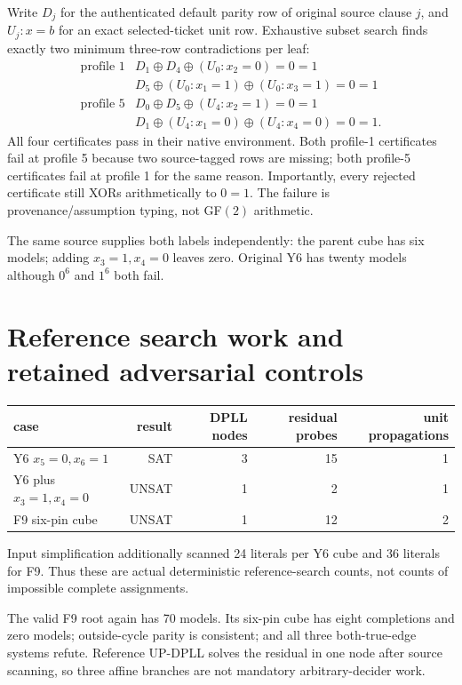 \documentclass[11pt]{article}
\begin{document}
Write $D_j$ for the authenticated default parity row of original source clause $j$, and $U_{j}:x=b$ for an exact selected-ticket unit row.  Exhaustive subset search finds exactly two minimum three-row contradictions per leaf:
\[
\begin{array}{c|l}
\text{profile 1}&D_1\oplus D_4\oplus(U_0:x_2=0)=0=1\\
&D_5\oplus(U_0:x_1=1)\oplus(U_0:x_3=1)=0=1\\[2pt]
\text{profile 5}&D_0\oplus D_5\oplus(U_4:x_2=1)=0=1\\
&D_1\oplus(U_4:x_1=0)\oplus(U_4:x_4=0)=0=1.
\end{array}
\]
All four certificates pass in their native environment.  Both profile-1 certificates fail at profile 5 because two source-tagged rows are missing; both profile-5 certificates fail at profile 1 for the same reason.  Importantly, every rejected certificate still XORs arithmetically to $0=1$.  The failure is provenance/assumption typing, not GF$(2)$ arithmetic.

The same source supplies both labels independently: the parent cube has six models; adding $x_3=1,x_4=0$ leaves zero.  Original Y6 has twenty models although $0^6$ and $1^6$ both fail.

\section{Reference search work and retained adversarial controls}
\begin{center}
\begin{tabular}{lrrrr}
\toprule
case&result&DPLL nodes&residual probes&unit propagations\\
\midrule
Y6 $x_5=0,x_6=1$&SAT&3&15&1\\
Y6 plus $x_3=1,x_4=0$&UNSAT&1&2&1\\
F9 six-pin cube&UNSAT&1&12&2\\
\bottomrule
\end{tabular}
\end{center}
Input simplification additionally scanned 24 literals per Y6 cube and 36 literals for F9.  Thus these are actual deterministic reference-search counts, not counts of impossible complete assignments.

The valid F9 root again has 70 models.  Its six-pin cube has eight completions and zero models; outside-cycle parity is consistent; and all three both-true-edge systems refute.  Reference UP-DPLL solves the residual in one node after source scanning, so three affine branches are not mandatory arbitrary-decider work.
\end{document}
